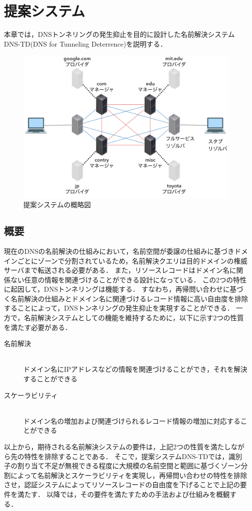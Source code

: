 \section{提案システム}
本章では，DNSトンネリングの発生抑止を目的に設計した名前解決システムDNS-TD(DNS for Tunneling Deterrence)を説明する．
\begin{figure}[h]
 \centering
 \label{fig:abstruct-DNS-TD-architecture}
 \includegraphics[scale=0.6]{figure/new-architecture-DNS-TD.png}
 \caption{提案システムの概略図}
\end{figure}
\subsection{概要}
\label{sec:DNS-TD}
現在のDNSの名前解決の仕組みにおいて，名前空間が委譲の仕組みに基づきドメインごとにゾーンで分割されているため，名前解決クエリは目的ドメインの権威サーバまで転送される必要がある．
また，リソースレコードはドメイン名に関係ない任意の情報を関連づけることができる設計になっている．
この2つの特性に起因して，DNSトンネリングは機能する．
すなわち，再帰問い合わせに基づく名前解決の仕組みとドメイン名に関連づけるレコード情報に高い自由度を排除することによって，DNSトンネリングの発生抑止を実現することができる．
一方で，名前解決システムとしての機能を維持するために，以下に示す2つの性質を満たす必要がある．
\begin{description}
 \item[名前解決]\mbox{}\\ ドメイン名にIPアドレスなどの情報を関連づけることができ，それを解決することができる
 \item[スケーラビリティ]\mbox{}\\ ドメイン名の増加および関連づけられるレコード情報の増加に対応することができる
\end{description}
以上から，期待される名前解決システムの要件は，上記2つの性質を満たしながら先の特性を排除することである．
そこで，提案システムDNS-TDでは，識別子の割り当て不足が無視できる程度に大規模の名前空間と範囲に基づくゾーン分割によって名前解決とスケーラビリティを実現し，再帰問い合わせの特性を排除させ，認証システムによってリソースレコードの自由度を下げることで上記の要件を満たす．
以降では，その要件を満たすための手法および仕組みを概観する．\newline

